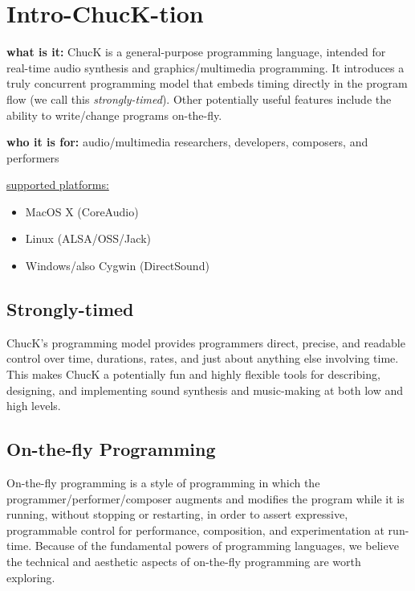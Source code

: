 \chapter{Intro-ChucK-tion} 

{\bf what is it:} ChucK is a general-purpose programming language, intended for 
real-time audio synthesis and graphics/multimedia programming.  It 
introduces a truly concurrent programming model that embeds timing 
directly in the program flow (we call this \textit{strongly-timed}).  Other 
potentially useful features include the ability to write/change programs on-the-fly.

{\bf who it is for:} audio/multimedia researchers, developers, composers, and performers

\underline{supported platforms:}
\begin{itemize}
 \item MacOS X (CoreAudio)
 \item Linux (ALSA/OSS/Jack)
 \item Windows/also Cygwin (DirectSound)
\end{itemize}

\section*{Strongly-timed}
ChucK's programming model provides programmers direct, precise, and readable control over time, durations, rates, and just about anything else involving time.  This makes ChucK a potentially fun and highly flexible tools for describing, designing, and implementing sound synthesis and music-making at both low and high levels.

\section*{On-the-fly Programming}
On-the-fly programming is a style of programming in which the programmer/performer/composer 
augments and modifies the program while it is running, without stopping or restarting, 
in order to assert expressive, programmable control for performance, composition, and 
experimentation at run-time. Because of the fundamental powers of programming languages, 
we believe the technical and aesthetic aspects of on-the-fly programming are worth exploring.